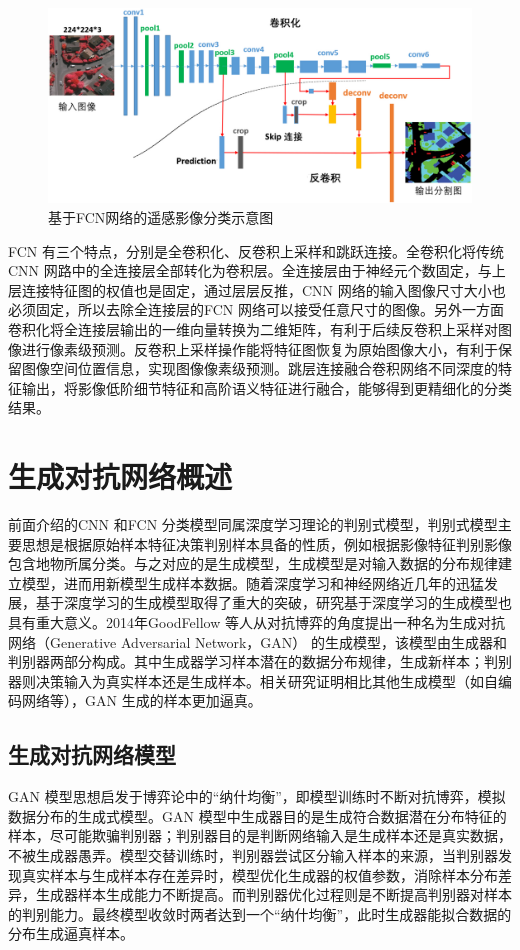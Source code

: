 \begin{figure}[htb]
  \centering
  \includegraphics[width=1.0\textwidth]{figures/vgg-fcn}
  \caption{基于FCN网络的遥感影像分类示意图}\label{fig:vgg-fcn}
\end{figure}

FCN 有三个特点，分别是全卷积化、反卷积上采样和跳跃连接。全卷积化将传统CNN 网路中的全连接层全部转化为卷积层。全连接层由于神经元个数固定，与上层连接特征图的权值也是固定，通过层层反推，CNN 网络的输入图像尺寸大小也必须固定，所以去除全连接层的FCN 网络可以接受任意尺寸的图像。另外一方面卷积化将全连接层输出的一维向量转换为二维矩阵，有利于后续反卷积上采样对图像进行像素级预测。反卷积上采样操作能将特征图恢复为原始图像大小，有利于保留图像空间位置信息，实现图像像素级预测。跳层连接融合卷积网络不同深度的特征输出，将影像低阶细节特征和高阶语义特征进行融合，能够得到更精细化的分类结果。

\section{生成对抗网络概述}
\label{sec:chap02-3}
前面介绍的CNN 和FCN 分类模型同属深度学习理论的判别式模型，判别式模型主要思想是根据原始样本特征决策判别样本具备的性质，例如根据影像特征判别影像包含地物所属分类。与之对应的是生成模型，生成模型是对输入数据的分布规律建立模型，进而用新模型生成样本数据。随着深度学习和神经网络近几年的迅猛发展，基于深度学习的生成模型取得了重大的突破，研究基于深度学习的生成模型也具有重大意义。2014年GoodFellow 等人从对抗博弈的角度提出一种名为生成对抗网络（Generative Adversarial Network，GAN）\cite{goodfellow2014generative} 的生成模型，该模型由生成器和判别器两部分构成。其中生成器学习样本潜在的数据分布规律，生成新样本；判别器则决策输入为真实样本还是生成样本。相关研究\cite{mirza2014conditional}证明相比其他生成模型（如自编码网络等），GAN 生成的样本更加逼真。 

\subsection{生成对抗网络模型}
\label{sec:first-1}
GAN 模型思想启发于博弈论中的“纳什均衡”，即模型训练时不断对抗博弈，模拟数据分布的生成式模型。GAN 模型中生成器目的是生成符合数据潜在分布特征的样本，尽可能欺骗判别器；判别器目的是判断网络输入是生成样本还是真实数据，不被生成器愚弄。模型交替训练时，判别器尝试区分输入样本的来源，当判别器发现真实样本与生成样本存在差异时，模型优化生成器的权值参数，消除样本分布差异，生成器样本生成能力不断提高。而判别器优化过程则是不断提高判别器对样本的判别能力。最终模型收敛时两者达到一个“纳什均衡”，此时生成器能拟合数据的分布生成逼真样本。


